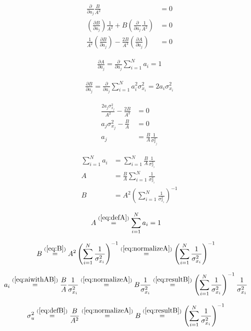 \documentclass[20pt]{extarticle}
\begin{document}
\begin{align}
    \frac{\partial}{\partial a_{j}}\frac{B}{A^{2}}&=0\\
    \left(\frac{\partial B}{\partial a_{j}}\right)\frac{1}{A^{2}}
    +B\left(\frac{\partial}{\partial a_{j}}\frac{1}{A^{2}}\right)&=0\\
    \frac{1}{A^{2}}\left(\frac{\partial B}{\partial a_{j}}\right)
    -\frac{2B}{A^{3}}\left(\frac{\partial A}{\partial a_{j}}\right)&=0
\end{align}

\begin{align}
    \frac{\partial A}{\partial a_{j}}
    =\frac{\partial}{\partial a_{j}}\sum_{i=1}^{N}a_{i}
    =1
\end{align}

\begin{align}
    \frac{\partial B}{\partial a_{j}}
    =\frac{\partial}{\partial a_{j}}\sum_{i=1}^{N}a_{i}^{2}\sigma_{x_{i}}^{2}
    =2a_{i}\sigma_{x_{i}}^{2}
\end{align}

\begin{align}
    \frac{2a_{j}\sigma_{x_{j}}^{2}}{A^{2}}
    -\frac{2B}{A^{3}}&=0\\
    a_{j}\sigma_{x_{j}}^{2}
    -\frac{B}{A}&=0\\
    \label{eq:aiwithAB}
    a_{j}
    &=\frac{B}{A}\frac{1}{\sigma_{x_{j}}^{2}}
\end{align}

\begin{align}
    \sum_{i=1}^{N}a_{i}
    &=\sum_{i=1}^{N}\frac{B}{A}\frac{1}{\sigma_{x_{i}}^{2}}\\
    A
    &=\frac{B}{A}\sum_{i=1}^{N}\frac{1}{\sigma_{x_{i}}^{2}}\\
    \label{eq:B}
    B
    &=A^{2}\left(\sum_{i=1}^{N}\frac{1}{\sigma_{x_{i}}^{2}}\right)^{-1}
\end{align}

\begin{align}
    \label{eq:normalizeA}
    A
    &\overset{(\ref{eq:defA})}{=}\sum_{i=1}^{N}a_{i}=1
\end{align}

\begin{align}
    \label{eq:resultB}
    B
    &\overset{(\ref{eq:B})}{=}A^{2}\left(\sum_{i=1}^{N}\frac{1}{\sigma_{x_{i}}^{2}}\right)^{-1}
    \overset{(\ref{eq:normalizeA})}{=}\left(\sum_{i=1}^{N}\frac{1}{\sigma_{x_{i}}^{2}}\right)^{-1}
\end{align}

\begin{align}
    \label{eq:resultA}
    a_{i}
    &\overset{(\ref{eq:aiwithAB})}{=}\frac{B}{A}\frac{1}{\sigma_{x_{i}}^{2}}
    \overset{(\ref{eq:normalizeA})}{=}B\frac{1}{\sigma_{x_{i}}^{2}}
    \overset{(\ref{eq:resultB})}{=}\left(\sum_{i=1}^{N}\frac{1}{\sigma_{x_{i}}^{2}}\right)^{-1}\frac{1}{\sigma_{x_{i}}^{2}}
\end{align}

\begin{align}
    \sigma_{u}^{2}
    &\overset{(\ref{eq:defB})}{=} \frac{B}{A^{2}}
    \overset{(\ref{eq:normalizeA})}{=} B
    \overset{(\ref{eq:resultB})}{=} \left(\sum_{i=1}^{N}\frac{1}{\sigma_{x_{i}}^{2}}\right)^{-1}
\end{align}
\end{document}
